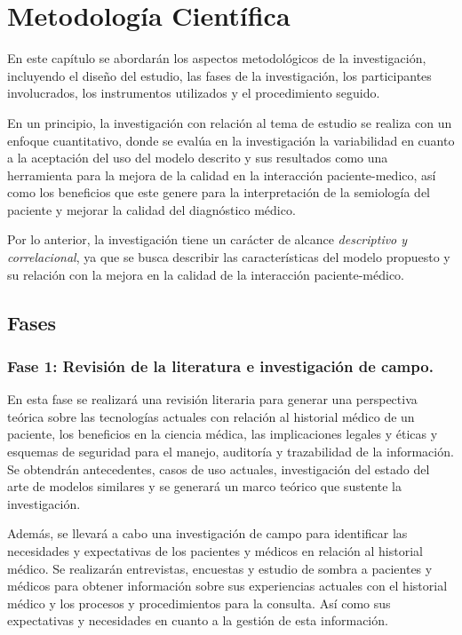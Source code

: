 \section{Metodología Científica}
En este capítulo se abordarán los aspectos metodológicos de la investigación, incluyendo el diseño del estudio, las fases de la investigación, los participantes involucrados, los instrumentos utilizados y el procedimiento seguido.

En un principio, la investigación con relación al tema de estudio se realiza con un enfoque cuantitativo, donde se evalúa en la investigación la variabilidad en cuanto a la aceptación del uso del modelo descrito y sus resultados como una herramienta para la mejora de la calidad en la interacción paciente-medico, así como los beneficios que este genere para la interpretación de la semiología del paciente y mejorar la calidad del diagnóstico médico.

Por lo anterior, la investigación tiene un carácter de alcance \textit{descriptivo y correlacional}, ya que se busca describir las características del modelo propuesto y su relación con la mejora en la calidad de la interacción paciente-médico.
    \subsection{Fases}
    \subsubsection{Fase 1: Revisión de la literatura e investigación de campo.}
    En esta fase se realizará una revisión literaria para generar una perspectiva teórica sobre las tecnologías actuales con relación al historial médico de un paciente, los beneficios en la ciencia médica, las implicaciones legales y éticas y esquemas de seguridad para el manejo, auditoría y trazabilidad de la información. Se obtendrán antecedentes, casos de uso actuales, investigación del estado del arte de modelos similares y se generará un marco teórico que sustente la investigación.

    Además, se llevará a cabo una investigación de campo para identificar las necesidades y expectativas de los pacientes y médicos en relación al historial médico. Se realizarán entrevistas, encuestas y estudio de sombra a pacientes y médicos para obtener información sobre sus experiencias actuales con el historial médico y los procesos y procedimientos para la consulta. Así como sus expectativas y necesidades en cuanto a la gestión de esta información.

